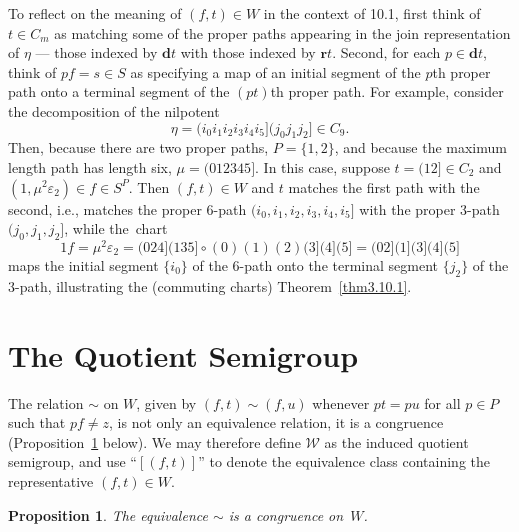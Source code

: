 \documentclass{surv-l}
\numberwithin{equation}{section}
\numberwithin{table}{section}
\numberwithin{figure}{section}
\theoremstyle{plain}
\newtheorem{proposition}[equation]{Proposition}
\theoremstyle{definition}
\begin{document}
To reflect on the meaning of $(f,t)\in W$ in the context of
10.1, first think of $t\in C_{m}$ as matching some of the proper
paths appearing in the join representation of $\eta$ --- those
indexed by $\textbf{d}t$ with those indexed by $\textbf{r}t$.
Second, for each $p\in \textbf{d}t$, think of $pf=s\in S$ as
specifying a map of an initial segment of the $p$th proper path
onto a terminal segment of the $(pt)$th proper path. For example,
consider the decomposition of the nilpotent
\[
\eta=(i_{0}i_{1}i_{2}i_{3}i_{4}i_{5}](j_{0}j_{1}j_{2}]\in C_{9}.
\]
Then, because there are two proper paths, $P=\{1,2\}$, and because
the maximum length path has length six, $\mu= (012345]$. In this
case, suppose $t=(12]\in C_{2}$ and $(1,\mu^{2}\varepsilon_{2})\in
f\in S^{P}$. Then $(f,t)\in W$ and $t$ matches the first path with
the second, i.e., matches the proper 6-path $(i_{0},
i_{1},i_{2},i_{3},i_{4},i_{5}]$ with the proper 3-path
$(j_{0},j_{1},j_{2}]$, while the~chart
\[
1 f=\mu^{2}\varepsilon_{2}=(024](135]\circ(0)(1)(2)(3](4](5]=(02](1](3](4](5]
\]
maps the initial segment $\{i_{0}\}$ of the 6-path onto the
terminal segment $\{j_{2}\}$ of the 3-path, illustrating the
(commuting charts)
Theorem~\ref{thm3.10.1}.

\section{The Quotient Semigroup}\label{sec5.19}

The relation $\sim$ on $W$, given by $(f,t)\sim(f,u)$ whenever
$pt=pu$ for all $p\in P$ such that $pf\neq z$, is not only an
equivalence relation, it is a congruence
(Proposition~\ref{prop5.19.1} below). We may therefore define
$\mathcal{W}$ as the induced quotient semigroup, and use
``$[(f,t)]$'' to denote the equivalence class containing the
representative $(f,t)\in W$.

\begin{proposition}\label{prop5.19.1}
The equivalence $\sim$ is a congruence on~$W$.
\end{proposition}
\end{document}
